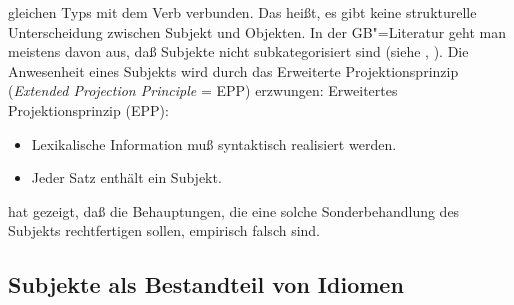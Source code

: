 gleichen Typs mit dem Verb verbunden.
Das heißt, es gibt keine strukturelle Unterscheidung zwischen Subjekt und 
Objekten. In der GB"=Literatur geht man meistens
davon aus, daß Subjekte nicht subkategorisiert sind (siehe \zb {}, ).
Die Anwesenheit eines Subjekts wird durch das Erweiterte Projektionsprinzip (\emph{Extended Projection
Principle} = EPP) erzwungen:
\ea
Erweitertes Projektionsprinzip (EPP):
\begin{itemize}
\item Lexikalische Information muß syntaktisch realisiert werden.
\item Jeder Satz enthält ein Subjekt. 
\end{itemize}
\z

\noindent
\citet[Kapitel~2]{Bresnan82c} hat gezeigt, daß die Behauptungen,
die eine solche Sonderbehandlung des Subjekts rechtfertigen sollen, empirisch falsch sind.


\subsection{Subjekte als Bestandteil von Idiomen}


